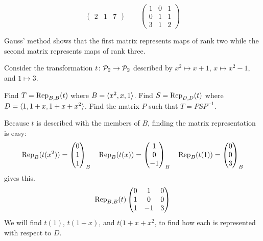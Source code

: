 \begin{exercises}
\begin{equation*}
\begin{pmatrix}
          2  &1  &7
       \end{pmatrix}
       \qquad
       \begin{pmatrix}
          1  &0  &1  \\
          0  &1  &1  \\
          3  &1  &2
       \end{pmatrix}
    \end{equation*}
    \begin{answer}
      Gauss' method shows that
      the first matrix represents maps of rank two while the second
      matrix represents maps of rank three.
    \end{answer}
  \item 
    Consider the transformation $\map{t}{\polyspace_2}{\polyspace_2}$
    described by
    $x^2\mapsto x+1$, $x\mapsto x^2-1$, and $1\mapsto 3$.
    \begin{exparts}
      \partsitem Find $T=\rep{t}{B,B}$ where $B=\sequence{x^2,x,1}$. 
      \partsitem Find $S=\rep{t}{D,D}$ where $D=\sequence{1,1+x,1+x+x^2}$. 
      \partsitem Find the matrix $P$ such that $T=PSP^{-1}$. 
    \end{exparts}
    \begin{answer}
      \begin{exparts}
        \partsitem Because $t$ is described with the members of $B$,
          finding the matrix representation is easy:
          \begin{equation*}
            \rep{t(x^2)}{B}=\colvec{0 \\ 1 \\ 1}_B
            \quad
            \rep{t(x)}{B}=\colvec{1 \\ 0 \\ -1}_B
            \quad
            \rep{t(1)}{B}=\colvec{0 \\ 0 \\ 3}_B
          \end{equation*}
          gives this.
          \begin{equation*}
            \rep{t}{B,B}
            \begin{pmatrix}
              0  &1  &0  \\
              1  &0  &0  \\
              1  &-1 &3  
            \end{pmatrix}
          \end{equation*}
        \partsitem We will find $t(1)$, $t(1+x)$, and $t(1+x+x^2$,
          to find how each is represented with respect to $D$.

\end{exparts}
\end{answer}
\end{exercises}
